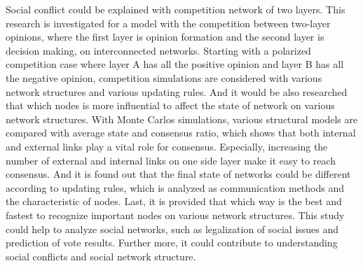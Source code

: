 

\begin{englishabstract}
Social conflict could be explained with competition network of two layers. This research is investigated for a model with the competition between two-layer opinions, where the first layer is opinion formation and the second layer is decision making, on interconnected networks. Starting with a polarized competition case where layer A has all the positive opinion and layer B has all the negative opinion, competition simulations are considered with various network structures and various updating rules. And it would be also researched that which nodes is more influential to affect the state of network on various network structures. With Monte Carlos simulations, various structural models are compared with average state and consensus ratio, which shows that both internal and external links play a vital role for consensus. Especially, increasing the number of external and internal links on one side layer make it easy to reach consensus. And it is found out that the final state of networks could be different according to updating rules, which is analyzed as communication methods and the characteristic of nodes. Last, it is provided that which way is the best and fastest to recognize important nodes on various network structures. This study could help to analyze social networks, such as legalization of social issues and prediction of vote results. Further more, it could contribute to understanding social conflicts and social network structure.
\end{englishabstract}

